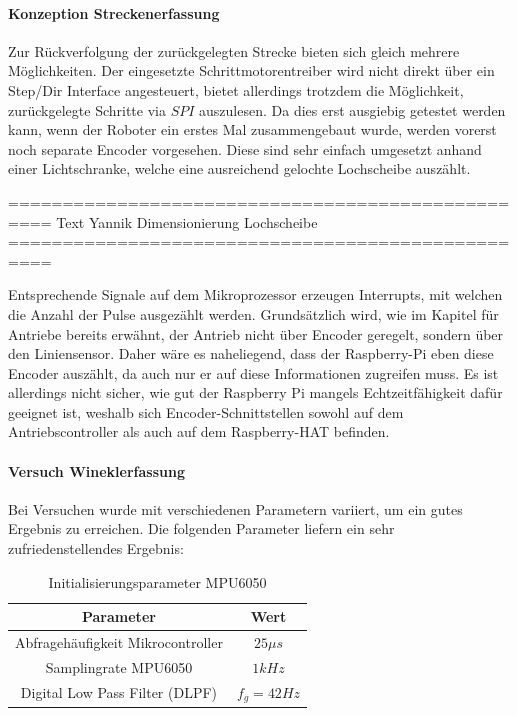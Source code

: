 \documentclass[main.tex]{subfiles} %
\begin{document}
\paragraph{Konzeption Streckenerfassung}
Zur Rückverfolgung der zurückgelegten Strecke bieten sich gleich mehrere
Möglichkeiten. Der eingesetzte Schrittmotorentreiber wird nicht direkt über ein
Step/Dir Interface angesteuert, bietet allerdings trotzdem die Möglichkeit,
zurückgelegte Schritte via $SPI$ auszulesen. Da dies erst ausgiebig getestet
werden kann, wenn der Roboter ein erstes Mal zusammengebaut wurde, werden
vorerst noch separate Encoder vorgesehen. Diese sind sehr einfach umgesetzt
anhand einer Lichtschranke, welche eine ausreichend gelochte Lochscheibe
auszählt.

==================================================
Text Yannik Dimensionierung Lochscheibe
==================================================

Entsprechende Signale auf dem Mikroprozessor erzeugen Interrupts, mit welchen
die Anzahl der Pulse ausgezählt werden. Grundsätzlich wird, wie im Kapitel für
Antriebe bereits erwähnt, der Antrieb nicht über Encoder geregelt, sondern über
den Liniensensor. Daher wäre es naheliegend, dass der Raspberry-Pi eben diese
Encoder auszählt, da auch nur er auf diese Informationen zugreifen muss. Es ist
allerdings nicht sicher, wie gut der Raspberry Pi mangels Echtzeitfähigkeit
dafür geeignet ist, weshalb sich Encoder-Schnittstellen sowohl auf dem
Antriebscontroller als auch auf dem Raspberry-HAT befinden.

\paragraph{Versuch Wineklerfassung}
Bei Versuchen wurde mit verschiedenen Parametern variiert, um ein gutes
Ergebnis zu erreichen. Die folgenden Parameter liefern ein sehr
zufriedenstellendes Ergebnis:

\begin{table}[h]                                    %
    \centering
    \begin{tabular}{|c|c|}                        %
        \hline
        Parameter                         & Wert         \\ \hline
        Abfragehäufigkeit Mikrocontroller & $25 \mu s$   \\ \hline
        Samplingrate MPU6050              & $1 kHz$      \\ \hline
        Digital Low Pass Filter (DLPF)    & $f_g = 42Hz$ \\ \hline
    \end{tabular}
    \caption{Initialisierungsparameter MPU6050}
    \label{tab:params_mpu6050}
\end{table}
\end{document}
